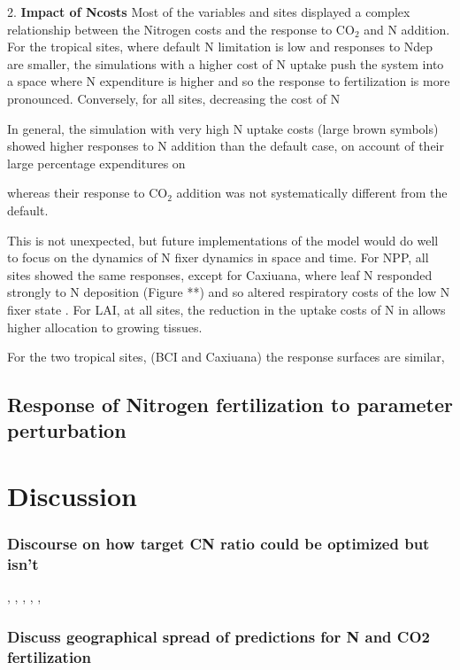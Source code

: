 \documentclass[draft,linenumbers]{agujournal}
\begin{document}
2. \textbf{Impact of Ncosts}
Most of the variables and sites displayed a complex relationship between the Nitrogen costs and the response to CO$_{2}$ and N addition. 
For the tropical sites, where default N limitation is low and responses to Ndep are smaller, the simulations with a higher cost of N uptake push the system into a space where N expenditure is higher and so the response to fertilization is more pronounced. Conversely, for all sites, decreasing the cost of N 

In general, the simulation with very high N uptake costs (large brown symbols) showed higher responses to N addition than the default case, on account of their large percentage expenditures on 

whereas their response to CO$_{2}$ addition was not systematically different from the default.  





This is not unexpected, but future implementations of the model would do well to focus on the dynamics of N fixer dynamics in space and time. For NPP, all sites showed the same responses, except for Caxiuana, where leaf N responded strongly to N deposition (Figure **) and so altered respiratory costs of the low N fixer state . For LAI, at all sites, the reduction in the uptake costs of N in  allows higher allocation to growing tissues. 



For the two tropical sites, (BCI and Caxiuana) the response surfaces are similar,

\subsection{Response of Nitrogen fertilization to parameter perturbation}


\section{Discussion}

\subsubsection{Discourse on how target CN ratio could be optimized but isn't}
\cite{thomas2014}, \cite{friedlingstein1999}, \cite{franklin2012}, \cite{mcmurtrie2013}, \cite{anten2011}, \cite{vanwijk2003}

\subsubsection{Discuss geographical spread of predictions for N and CO2 fertilization}
\cite{hickler2008}
\end{document}
